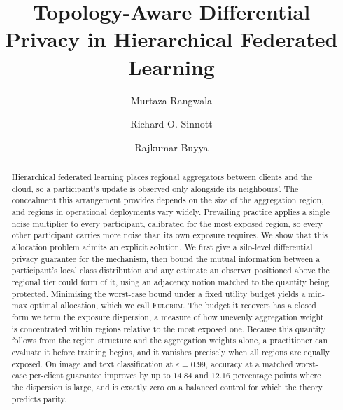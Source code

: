 \documentclass[acmsmall,screen,review,anonymous]{acmart}
\theoremstyle{acmdefinition}%
\newcommand{\Fulcrum}{\textsc{Fulcrum}\xspace}
\begin{document}
\title{Topology-Aware Differential Privacy in Hierarchical Federated Learning}

\author{Murtaza Rangwala}

\author{Richard O. Sinnott}

\author{Rajkumar Buyya}

\renewcommand{\shortauthors}{Rangwala et al.}

\begin{abstract}
Hierarchical federated learning places regional aggregators between clients and the
cloud, so a participant's update is observed only alongside its
neighbours'. The concealment this arrangement provides depends on the size of the
aggregation region, and regions in operational deployments vary widely.
Prevailing practice applies a single noise multiplier to every participant, calibrated
for the most exposed region, so every other participant carries more
noise than its own exposure requires. We show that this allocation problem admits an
explicit solution. We first give a silo-level differential privacy guarantee for the
mechanism, then bound the mutual information between a participant's local class
distribution and any estimate an observer positioned above the regional tier could form
of it, using an adjacency notion matched to the quantity being protected. Minimising the
worst-case bound under a fixed utility budget yields a min-max optimal allocation, which
we call \Fulcrum. The budget it recovers has a closed form we term the exposure
dispersion, a measure of how unevenly aggregation weight is concentrated within regions
relative to the most exposed one. Because this quantity follows from the region
structure and the aggregation weights alone, a practitioner can evaluate it before
training begins, and it vanishes precisely when all regions are equally exposed. On
image and text classification at $\varepsilon = 0.99$, accuracy at a matched worst-case
per-client guarantee improves by up to $14.84$ and $12.16$ percentage points where the
dispersion is large, and is exactly zero on a balanced control for which the theory
predicts parity.
\end{abstract}
\end{document}
